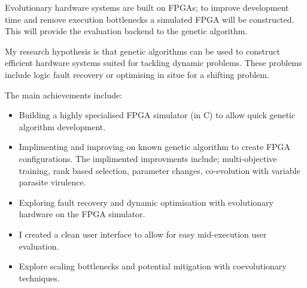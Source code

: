 Evolutionary hardware systems are built on FPGAs; to improve development
time and remove execution bottlenecks a simulated FPGA will be constructed.
This will provide the evaluation backend to the genetic algorithm.

My research hypothesis is that genetic algorithms can be used to construct
efficient hardware systems suited for tackling dynamic problems. These
problems include logic fault recovery or optimising in situe for a shifting
problem.

The main achievements include:
\begin{itemize}
	\item Building a highly specialised FPGA simulator (in C) to allow quick
		genetic algorithm development.
	\item Implimenting and improving on known genetic algorithm to
		create FPGA configurations. The implimented improvments include; multi-objective training,
		rank based selection, parameter changes, co-evolution with variable parasite
		virulence.
	\item Exploring fault recovery and dynamic optimisation with evolutionary
		hardware on the FPGA simulator.
	\item I created a clean user interface to allow for easy mid-execution user
		evaluation.
	\item Explore scaling bottlenecks and potential mitigation with coevolutionary
		techniques.
\end{itemize}
